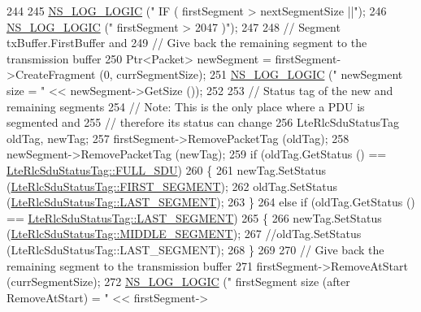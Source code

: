 \begin{DoxyCode}
244 
245           \hyperlink{group__logging_ga88acd260151caf2db9c0fc84997f45ce}{NS\_LOG\_LOGIC} (\textcolor{stringliteral}{"    IF ( firstSegment > nextSegmentSize ||"});
246           \hyperlink{group__logging_ga88acd260151caf2db9c0fc84997f45ce}{NS\_LOG\_LOGIC} (\textcolor{stringliteral}{"         firstSegment > 2047 )"});
247 
248           \textcolor{comment}{// Segment txBuffer.FirstBuffer and}
249           \textcolor{comment}{// Give back the remaining segment to the transmission buffer}
250           Ptr<Packet> newSegment = firstSegment->CreateFragment (0, currSegmentSize);
251           \hyperlink{group__logging_ga88acd260151caf2db9c0fc84997f45ce}{NS\_LOG\_LOGIC} (\textcolor{stringliteral}{"    newSegment size   = "} << newSegment->GetSize ());
252 
253           \textcolor{comment}{// Status tag of the new and remaining segments}
254           \textcolor{comment}{// Note: This is the only place where a PDU is segmented and}
255           \textcolor{comment}{// therefore its status can change}
256           LteRlcSduStatusTag oldTag, newTag;
257           firstSegment->RemovePacketTag (oldTag);
258           newSegment->RemovePacketTag (newTag);
259           \textcolor{keywordflow}{if} (oldTag.GetStatus () == \hyperlink{classns3_1_1LteRlcSduStatusTag_ae7822c5cc0d54a3d193b09a91ed6f133ade41b0025c66cd211e992196f314d4a5}{LteRlcSduStatusTag::FULL\_SDU})
260             \{
261               newTag.SetStatus (\hyperlink{classns3_1_1LteRlcSduStatusTag_ae7822c5cc0d54a3d193b09a91ed6f133afda65e6233ba6fd1cd8aacf54cd11269}{LteRlcSduStatusTag::FIRST\_SEGMENT});
262               oldTag.SetStatus (\hyperlink{classns3_1_1LteRlcSduStatusTag_ae7822c5cc0d54a3d193b09a91ed6f133a4e59540a0a5c4530b61e4feda355be7b}{LteRlcSduStatusTag::LAST\_SEGMENT});
263             \}
264           \textcolor{keywordflow}{else} \textcolor{keywordflow}{if} (oldTag.GetStatus () == \hyperlink{classns3_1_1LteRlcSduStatusTag_ae7822c5cc0d54a3d193b09a91ed6f133a4e59540a0a5c4530b61e4feda355be7b}{LteRlcSduStatusTag::LAST\_SEGMENT})
265             \{
266               newTag.SetStatus (\hyperlink{classns3_1_1LteRlcSduStatusTag_ae7822c5cc0d54a3d193b09a91ed6f133a37a54694d337625c0c8541e3008d1d64}{LteRlcSduStatusTag::MIDDLE\_SEGMENT});
267               \textcolor{comment}{//oldTag.SetStatus (LteRlcSduStatusTag::LAST\_SEGMENT);}
268             \}
269 
270           \textcolor{comment}{// Give back the remaining segment to the transmission buffer}
271           firstSegment->RemoveAtStart (currSegmentSize);
272           \hyperlink{group__logging_ga88acd260151caf2db9c0fc84997f45ce}{NS\_LOG\_LOGIC} (\textcolor{stringliteral}{"    firstSegment size (after RemoveAtStart) = "} << firstSegment->

\end{DoxyCode}
